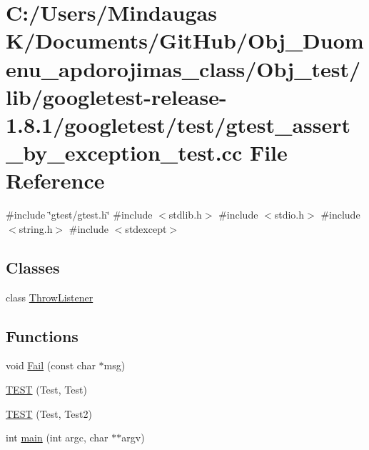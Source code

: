 \hypertarget{_obj__test_2lib_2googletest-release-1_88_81_2googletest_2test_2gtest__assert__by__exception__test_8cc}{}\section{C\+:/\+Users/\+Mindaugas K/\+Documents/\+Git\+Hub/\+Obj\+\_\+\+Duomenu\+\_\+apdorojimas\+\_\+class/\+Obj\+\_\+test/lib/googletest-\/release-\/1.8.1/googletest/test/gtest\+\_\+assert\+\_\+by\+\_\+exception\+\_\+test.cc File Reference}
\label{_obj__test_2lib_2googletest-release-1_88_81_2googletest_2test_2gtest__assert__by__exception__test_8cc}
{\ttfamily \#include \char`\"{}gtest/gtest.\+h\char`\"{}}\newline
{\ttfamily \#include $<$stdlib.\+h$>$}\newline
{\ttfamily \#include $<$stdio.\+h$>$}\newline
{\ttfamily \#include $<$string.\+h$>$}\newline
{\ttfamily \#include $<$stdexcept$>$}\newline
\subsection*{Classes}
\begin{DoxyCompactItemize}
\item 
class \mbox{\hyperlink{class_throw_listener}{Throw\+Listener}}
\end{DoxyCompactItemize}
\subsection*{Functions}
\begin{DoxyCompactItemize}
\item 
void \mbox{\hyperlink{_obj__test_2lib_2googletest-release-1_88_81_2googletest_2test_2gtest__assert__by__exception__test_8cc_a78ecbe7682643ac0413d57d0b9f27fa6}{Fail}} (const char $\ast$msg)
\item 
\mbox{\hyperlink{_obj__test_2lib_2googletest-release-1_88_81_2googletest_2test_2gtest__assert__by__exception__test_8cc_abd54dc4a1b6e0bcd993f8acfabe13400}{T\+E\+ST}} (Test, Test)
\item 
\mbox{\hyperlink{_obj__test_2lib_2googletest-release-1_88_81_2googletest_2test_2gtest__assert__by__exception__test_8cc_a5a30210f18c6e07037bb61edc36ffc6c}{T\+E\+ST}} (Test, Test2)
\item 
int \mbox{\hyperlink{_obj__test_2lib_2googletest-release-1_88_81_2googletest_2test_2gtest__assert__by__exception__test_8cc_a3c04138a5bfe5d72780bb7e82a18e627}{main}} (int argc, char $\ast$$\ast$argv)
\end{DoxyCompactItemize}
